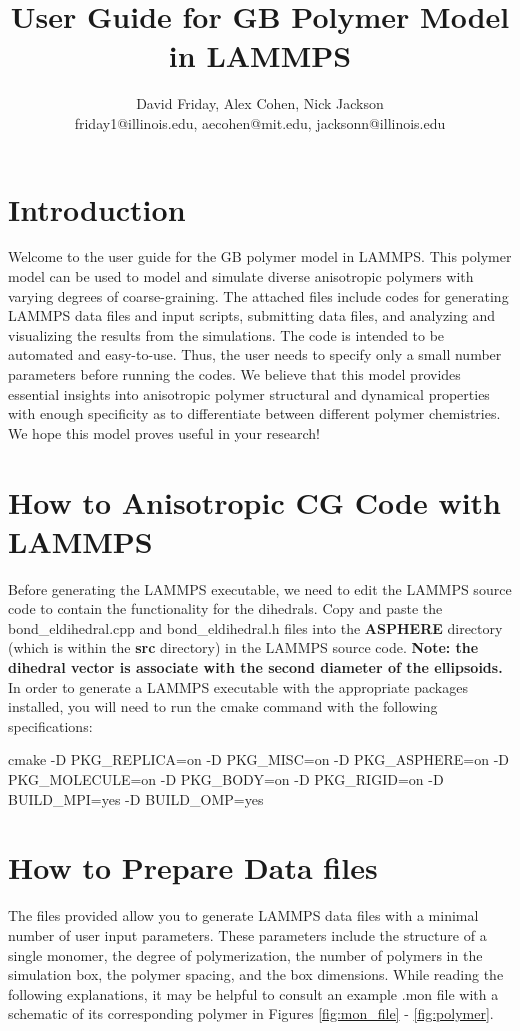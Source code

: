 \documentclass{article}
\title{User Guide for GB Polymer Model in LAMMPS}
\author{David Friday, Alex Cohen, Nick Jackson \\ friday1@illinois.edu, aecohen@mit.edu, jacksonn@illinois.edu}
\begin{document}
\maketitle

\section{Introduction}
Welcome to the user guide for the GB polymer model in LAMMPS. This polymer model can be used to model and simulate diverse anisotropic polymers with varying degrees of coarse-graining. The attached files include codes for generating LAMMPS data files and input scripts, submitting data files, and analyzing and visualizing the results from the simulations. The code is intended to be automated and easy-to-use. Thus, the user needs to specify only a small number parameters before running the codes. We believe that this model provides essential insights into anisotropic polymer structural and dynamical properties with enough specificity as to differentiate between different polymer chemistries. We hope this model proves useful in your research!

\section{How to Anisotropic CG Code with LAMMPS}
Before generating the LAMMPS executable, we need to edit the LAMMPS source code to contain the functionality for the dihedrals. Copy and paste the bond\_eldihedral.cpp and bond\_eldihedral.h files into the \textbf{ASPHERE} directory (which is within the \textbf{src} directory) in the LAMMPS source code. \textbf{Note: the dihedral vector is associate with the second diameter of the ellipsoids.}
In order to generate a LAMMPS executable with the appropriate packages installed, you will need to run the cmake command with the following specifications:

cmake -D PKG\_REPLICA=on -D PKG\_MISC=on -D PKG\_ASPHERE=on -D PKG\_MOLECULE=on -D PKG\_BODY=on -D PKG\_RIGID=on -D BUILD\_MPI=yes -D BUILD\_OMP=yes

\section{How to Prepare Data files}
The files provided allow you to generate LAMMPS data files with a minimal number of user input parameters. These parameters include the structure of a single monomer, the degree of polymerization, the number of polymers in the simulation box, the polymer spacing, and the box dimensions. While reading the following explanations, it may be helpful to consult an example .mon file with a schematic of its corresponding polymer in Figures \ref{fig:mon_file} - \ref{fig:polymer}. 
\end{document}
